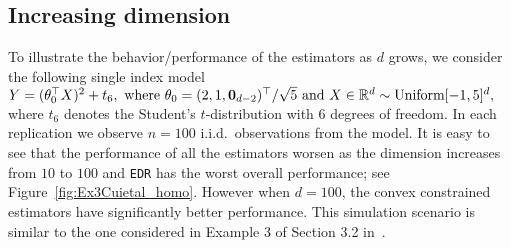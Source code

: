 {%
\subsection{Increasing dimension} %
\label{sub:increasing_dimension}
To illustrate the behavior/performance of the estimators  as $d$ grows, we consider the following single index model $Y=  (\theta_0^\top X)^2 + t_6, \text{ where } \theta_0= (2, 1, \mathbf{0}_{d-2})^\top/\sqrt{5} \text{ and } X\in \mathbb{R}^d \sim\text{Uniform}[-1,5]^d,$
where $t_6$ denotes the Student's $t$-distribution with $6$ degrees of freedom.
In each replication we observe $n= 100$ i.i.d.~observations from the model. It is easy to see that the performance of all the estimators worsen as the dimension increases from $10$ to $100$ and \texttt{EDR} has the worst overall performance; see Figure~\ref{fig:Ex3Cuietal_homo}. However when $d=100$, the convex constrained estimators have significantly better performance. This simulation scenario is similar  to the one considered in Example 3 of Section 3.2 in~\cite{cuietal11}.


}
